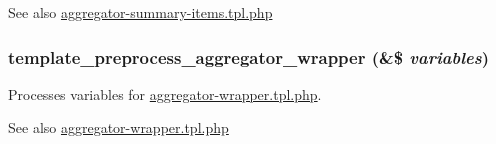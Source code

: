 \begin{DoxySeeAlso}{See also}
\hyperlink{aggregator-summary-items_8tpl_8php}{aggregator-\/summary-\/items.tpl.php} 
\end{DoxySeeAlso}
\hypertarget{aggregator_8pages_8inc_a95bcd00a54c249668f911199fa8021ba}{
\subsubsection[{template\_\-preprocess\_\-aggregator\_\-wrapper}]{\setlength{\rightskip}{0pt plus 5cm}template\_\-preprocess\_\-aggregator\_\-wrapper (\&\$ {\em variables})}}
\label{aggregator_8pages_8inc_a95bcd00a54c249668f911199fa8021ba}
Processes variables for \hyperlink{aggregator-wrapper_8tpl_8php}{aggregator-\/wrapper.tpl.php}.

\begin{DoxySeeAlso}{See also}
\hyperlink{aggregator-wrapper_8tpl_8php}{aggregator-\/wrapper.tpl.php} 
\end{DoxySeeAlso}
